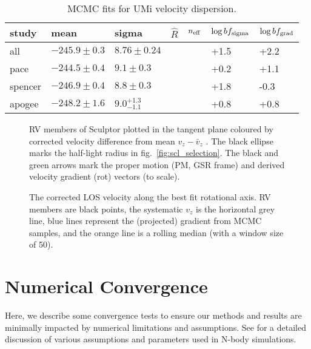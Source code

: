 \begin{table*}[t]
\centering
\caption[Ursa Minor RV fits]{\label{tbl:umi_rv_mcmc}MCMC fits for UMi velocity dispersion. }
\label{tbl:umi_rv_mcmc}
\begin{tabular}{lllllll}
\toprule
study & mean & sigma & $\hat R$ & $n_{\rm eff}$ & $\log bf_{\rm sigma}$ & $\log bf_{\rm grad}$\\
\midrule
all & $-245.9\pm0.3$ & $8.76\pm0.24$ &  &  & +1.5 & +2.2\\
pace & $-244.5\pm0.4$ & $9.1\pm0.3$ &  &  & +0.2 & +1.1\\
spencer & $-246.9\pm0.4$ & $8.8\pm0.3$ &  &  & +1.8 & -0.3\\
apogee & $-248.2\pm1.6$ & $9.0_{-1.1}^{+1.3}$ &  &  & +0.8 & +0.8\\
\bottomrule
\end{tabular}
\end{table*}

\begin{figure}
\centering
{}
\caption[Scl velocity sample]{RV members of Sculptor plotted in the
tangent plane coloured by corrected velocity difference from mean
\(v_z - \bar v_z\) . The black ellipse marks the half-light radius in
fig.~\ref{fig:scl_selection}. The black and green arrows mark the proper
motion (PM, GSR frame) and derived velocity gradient (rot) vectors (to
scale).}
\end{figure}

\begin{figure}
\centering
{}
\caption[Scl velocity gradient]{The corrected LOS velocity along the
best fit rotational axis. RV members are black points, the systematic
\(v_z\) is the horizontal grey line, blue lines represent the
(projected) gradient from MCMC samples, and the orange line is a rolling
median (with a window size of 50).}
\end{figure}

\section{Numerical Convergence}\label{numerical-convergence}

Here, we describe some convergence tests to ensure our methods and
results are minimally impacted by numerical limitations and assumptions.
See \citet{power+2003} for a detailed discussion of various assumptions
and parameters used in N-body simulations.

